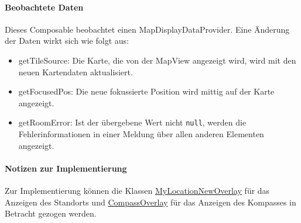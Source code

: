 \paragraph*{Beobachtete Daten}
Dieses Composable beobachtet einen MapDisplayDataProvider. 
Eine Änderung der Daten wirkt sich wie folgt aus:
\begin{itemize}
    \item getTileSource: Die Karte, die von der MapView angezeigt wird, wird mit den neuen 
    Kartendaten aktualisiert.
    \item getFocusedPos: Die neue fokussierte Position wird mittig auf der Karte angezeigt.
    \item getRoomError: Ist der übergebene Wert nicht \texttt{null}, werden die Fehlerinformationen 
    in einer Meldung über allen anderen Elementen angezeigt.
\end{itemize}

\paragraph*{Notizen zur Implementierung}
Zur Implementierung können die Klassen \href{https://osmdroid.github.io/osmdroid/javadocs/osmdroid-android/debug/org/osmdroid/views/overlay/mylocation/MyLocationNewOverlay.html}
{MyLocationNewOverlay} für das Anzeigen des Standorts und \href{https://osmdroid.github.io/osmdroid/javadocs/osmdroid-android/debug/org/osmdroid/views/overlay/compass/CompassOverlay.html}
{CompassOverlay} für das Anzeigen des Kompasses in Betracht gezogen werden.